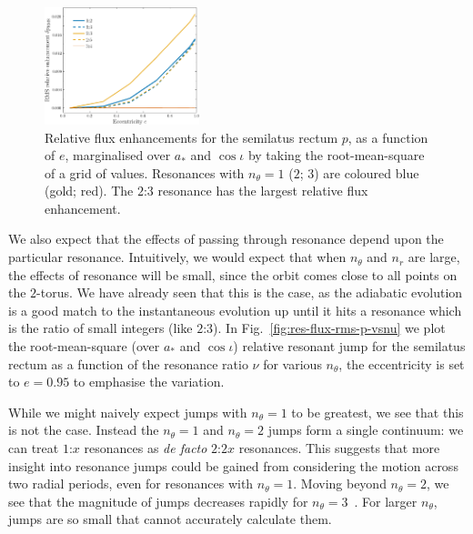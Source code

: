 \documentclass[aps,prd,amsfonts,amssymb,amsmath,nofootinbib,showpacs,superscriptaddress,twocolumn,floatfix]{revtex4-1}
\newcommand{\figref}[1]{Fig.~\ref{fig:#1}}
\begin{document}
\begin{figure}
\centering
\includegraphics[width=0.4\textwidth]{Fig_e_rms_p}
\caption{\label{fig:res-flux-rms-p}Relative flux enhancements for the semilatus rectum $p$, as a function of $e$, marginalised over $a_\ast$ and $\cos\iota$ by taking the root-mean-square of a grid of values. Resonances with $n_\theta = 1$ ($2$; $3$) are coloured blue (gold; red). The $2$:$3$ resonance has the largest relative flux enhancement.}
\end{figure}

We also expect that the effects of passing through resonance depend upon the particular resonance. Intuitively, we would expect that when $n_\theta$ and $n_r$ are large, the effects of resonance will be small, since the orbit comes close to all points on the $2$-torus. We have already seen that this is the case, as the adiabatic evolution is a good match to the instantaneous evolution up until it hits a resonance which is the ratio of small integers (like $2$:$3$). In \figref{res-flux-rms-p-vsnu} we plot the root-mean-square (over $a_\ast$ and $\cos\iota$) relative resonant jump for the semilatus rectum as a function of the resonance ratio $\nu$ for various $n_\theta$, the eccentricity is set to $e=0.95$ to emphasise the variation.

While we might naively expect jumps with $n_\theta = 1$ to be greatest, we see that this is not the case. Instead the $n_\theta = 1$ and $n_\theta = 2$ jumps form a single continuum: we can treat $1$:$x$ resonances as \emph{de facto} $2$:$2x$ resonances. This suggests that more insight into resonance jumps could be gained from considering the motion across two radial periods, even for resonances with $n_\theta = 1$. Moving beyond $n_\theta = 2$, we see that the magnitude of jumps decreases rapidly for $n_\theta = 3$~\cite{Flanagan2012a}. For larger $n_\theta$, jumps are so small that cannot accurately calculate them.
\end{document}
